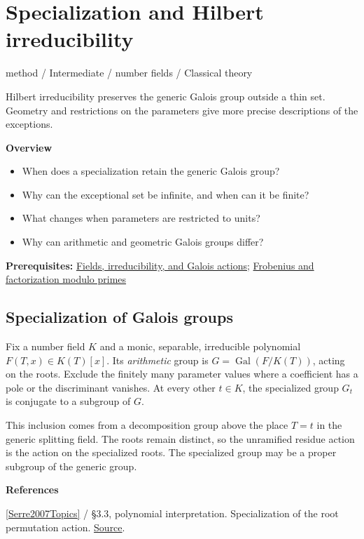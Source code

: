 \documentclass[11pt,a4paper,oneside,openany]{book}
\newenvironment{sources}{\par\smallskip\begingroup\footnotesize\color{atlasgray}\leftskip=10pt\setlength{\parskip}{2pt}}{\par\endgroup\smallskip}
\begin{document}
\chapter{Specialization and Hilbert irreducibility}\label{article:specialization}\hypertarget{article:specialization}{}\color{black}
{\sffamily\small\color{atlasgold}method / Intermediate / number fields / Classical theory}\par\medskip
Hilbert irreducibility preserves the generic Galois group outside a thin set. Geometry and restrictions on the parameters give more precise descriptions of the exceptions.\par\medskip
\textbf{Overview}\begin{itemize}
\item When does a specialization retain the generic Galois group?
\item Why can the exceptional set be infinite, and when can it be finite?
\item What changes when parameters are restricted to units?
\item Why can arithmetic and geometric Galois groups differ?
\end{itemize}
{\small\textbf{Prerequisites:} \hyperlink{article:foundations}{Fields, irreducibility, and Galois actions}; \hyperlink{article:frobenius}{Frobenius and factorization modulo primes}}\par
{}\section{Specialization of Galois groups}
\color{black} Fix a number field \(K\) and a monic, separable, irreducible polynomial \(F(T,x)\in K(T)[x]\). Its \emph{arithmetic} group is \(G=\operatorname{Gal}(F/K(T))\), acting on the roots. Exclude the finitely many parameter values where a coefficient has a pole or the discriminant vanishes. At every other \(t\in K\), the specialized group \(G_t\) is conjugate to a subgroup of \(G\).\par
\color{black} This inclusion comes from a decomposition group above the place \(T=t\) in the generic splitting field. The roots remain distinct, so the unramified residue action is the action on the specialized roots. The specialized group may be a proper subgroup of the generic group.\par
\begin{sources}
\textbf{References}\par\smallskip
\noindent\hyperlink{ref:Serre2007Topics}{[Serre2007Topics]} / §3.3, polynomial interpretation. Specialization of the root permutation action. \href{https://www.routledge.com/Topics-in-Galois-Theory-2nd-Edition/Serre/p/book/9780429064401}{Source}.\par
\end{sources}\color{black}
\end{document}
